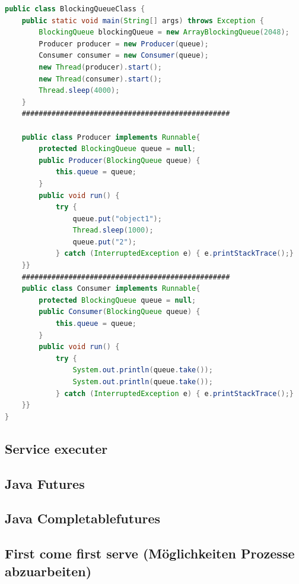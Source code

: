 \begin{lstlisting}[language=java,caption=Java BlockingQueue Beispiel,label=lst:impl:foo]
    public class BlockingQueueClass {
    public static void main(String[] args) throws Exception {
        BlockingQueue blockingQueue = new ArrayBlockingQueue(2048);
        Producer producer = new Producer(queue);
        Consumer consumer = new Consumer(queue);
        new Thread(producer).start();
        new Thread(consumer).start();
        Thread.sleep(4000);
    }
    #################################################

    public class Producer implements Runnable{
        protected BlockingQueue queue = null;
        public Producer(BlockingQueue queue) {
            this.queue = queue;
        }
        public void run() {
            try {
                queue.put("object1");
                Thread.sleep(1000);
                queue.put("2");
            } catch (InterruptedException e) { e.printStackTrace();}
    }}
    #################################################
    public class Consumer implements Runnable{
        protected BlockingQueue queue = null;
        public Consumer(BlockingQueue queue) {
            this.queue = queue;
        }
        public void run() {
            try {
                System.out.println(queue.take());
                System.out.println(queue.take());
            } catch (InterruptedException e) { e.printStackTrace();}
    }}
}
\end{lstlisting}

\subsection{Service executer}
\subsection{Java Futures}
\subsection{Java Completablefutures}
\subsection{First come first serve (Möglichkeiten Prozesse abzuarbeiten)}